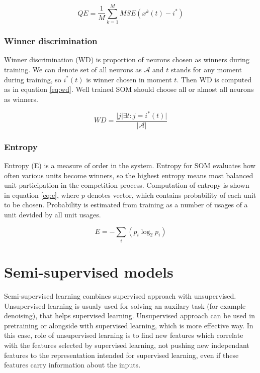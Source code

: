 \begin{equation}
	\label{eq:qe}
	QE = \frac{1}{M} \sum_{k=1}^M MSE(x^k(t) - i^*) %
\end{equation}

\subsubsection{Winner discrimination}
Winner discrimination (WD) is proportion of neurons chosen as winners during training. We can denote set of all neurons as $\mathcal{A}$ and $t$ stands for any moment during training, so $i^*(t)$ is winner chosen in moment $t$. Then WD is computed as in equation \ref{eq:wd}. Well trained SOM should choose all or almost all neurons as winners.

\begin{equation}
	\label{eq:wd}
	WD = \frac{|j | \exists t : j = i^*(t)|}{|\mathcal{A}|}
\end{equation}

\subsubsection{Entropy}
Entropy (E) is a measure of order in the system. Entropy for SOM evaluates how often various units become winners, so the highest entropy means most balanced unit participation in the competition process. Computation of entropy is shown in equation \ref{eq:e}, where $p$ denotes vector, which contains probability of each unit to be chosen. Probability is estimated from training as a number of usages of a unit devided by all unit usages.

\begin{equation}
	\label{eq:e}
	E = - \sum_i (p_i  \log_2{p_i})
\end{equation}

\section{Semi-supervised models}

Semi-supervised learning combines supervised approach with unsupervised. Unsupervised learning is usualy used for solving an auxilary task (for example denoising), that helps supervised learning. Unsupervised approach can be used in pretraining or alongside with supervised learning, which is more effective way. In this case, role of unsupervised learning is to find new features which correlate with the features selected by supervised learning, not pushing new independant features to the representation intended for supervised learning, even if these features carry information about the inputs. \cite{valpola2015}

